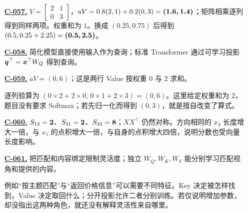 \begin{enumerate}[label={},leftmargin=4.8em,itemsep=4pt]
\item[\textbf{\hyperref[exercise:weighted-value-read]{C-057.}}] \leavevmode{}\label{solution:C-057}\label{solution:weighted-value-read}$V=\begin{bmatrix}2&1\\0&3\end{bmatrix}$，$aV=0.8(2,1)+0.2(0,3)=\boldsymbol{(1.6,1.4)}$；矩阵相乘逐列得到同样两项。权重和为 $1$。换成 $(0.25,0.75)$ 后得到 $(0.5,0.25+2.25)=\boldsymbol{(0.5,2.5)}$。
\item[\textbf{\hyperref[exercise:query-projection-choice]{C-058.}}] \leavevmode{}\label{solution:C-058}\label{solution:query-projection-choice}简化模型直接使用输入作为查询；标准 Transformer 通过可学习投影 $\boldsymbol{q}^\top=\boldsymbol{x}^\top W_Q$ 得到查询。
\item[\textbf{\hyperref[exercise:unnormalized-value-read]{C-059.}}] \leavevmode{}\label{solution:C-059}\label{solution:unnormalized-value-read}$aV=(0,6)$；这是两行 Value 按权重 $0$ 与 $2$ 求和。\par 逐列验算为 $(0\times2+2\times0,\,0\times1+2\times3)=(0,6)$。这里给定权重和为 $2$，题目没有要求 Softmax；若先归一化而得到 $(0,3)$，就是擅自改变了算式。
\item[\textbf{\hyperref[exercise:self-dot-length]{C-060.}}] \leavevmode{}\label{solution:C-060}\label{solution:self-dot-length}$S_{13}=\boldsymbol{2}$、$S_{31}=\boldsymbol{2}$、$S_{33}=\boldsymbol{8}$；$XX^\top$ 仍然对称。方向相同的 $x_3$ 长度增大一倍，与 $x_1$ 的点积增大一倍，与自身的点积增大四倍，说明分数也受向量长度影响。
\item[\textbf{\hyperref[exercise:key-value-projections]{C-061.}}] \leavevmode{}\label{solution:C-061}\label{solution:key-value-projections}把匹配和内容绑定限制灵活度；独立 $W_Q,W_K,W_V$ 能分别学习匹配视角和提供的内容。\par 例如“按主题匹配”与“返回价格信息”可以需要不同特征。Key 决定被怎样找到，Value 决定取回什么；分开投影允许二者分别训练。若仅说明增加参数，却没指出这两种角色，就还没有解释灵活性来自哪里。
\end{enumerate}
